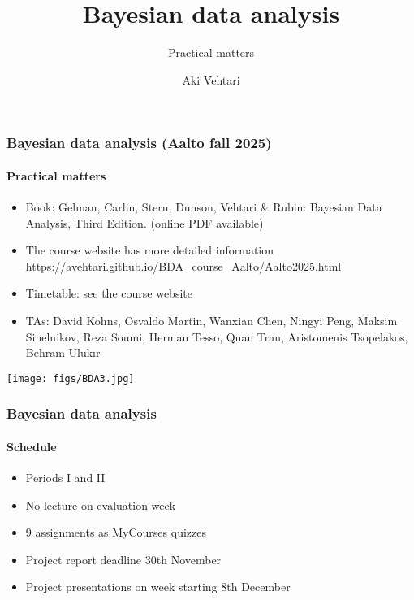 \documentclass[english,t]{beamer}
\title[]{Bayesian data analysis}
\subtitle{Practical matters}
\author{Aki Vehtari}
\institute[Aalto University]{}
\begin{document}
\begin{frame}
  \frametitle{Bayesian data analysis (Aalto fall 2025)}  %
  \framesubtitle{Practical matters}
  
  \begin{itemize}
  \item Book: Gelman, Carlin, Stern, Dunson, Vehtari \& Rubin: Bayesian Data
    Analysis, Third Edition. {\footnotesize (online PDF available)}
  \item The course website has more detailed information\\
    {\small\url{https://avehtari.github.io/BDA_course_Aalto/Aalto2025.html}}
  \item Timetable: see the course website
  \item TAs: David Kohns, Osvaldo Martin, Wanxian Chen, Ningyi Peng, Maksim Sinelnikov, Reza Soumi, Herman Tesso, Quan Tran, Aristomenis Tsopelakos, Behram Ulukır
    \end{itemize}
    \vspace{-0.5\baselineskip}
 \begin{center}
   \texttt{[image: figs/BDA3.jpg]}
 \end{center}

\end{frame}

\begin{frame}

  \frametitle{Bayesian data analysis}  %
  \framesubtitle{Schedule}

  \begin{itemize}
  \item Periods I and II
  \item No lecture on evaluation week
  \item 9 assignments as MyCourses quizzes
  \item Project report deadline 30th November
  \item Project presentations on week starting 8th December
  \end{itemize}
  
\end{frame}
\end{document}

